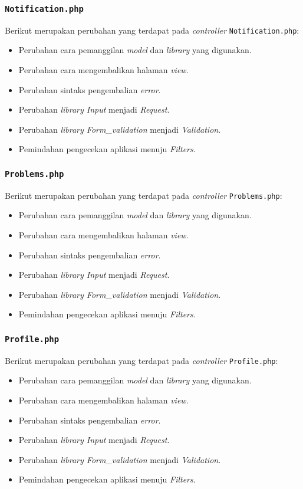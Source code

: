 \subsubsection{\texttt{Notification.php}}
Berikut merupakan perubahan yang terdapat pada  \textit{controller} \texttt{Notification.php}:
\begin{itemize}
	\item Perubahan cara pemanggilan \textit{model} dan \textit{library} yang digunakan.
	\item Perubahan cara mengembalikan halaman \textit{view}.
	\item Perubahan sintaks pengembalian \textit{error}.
	\item Perubahan \textit{library Input} menjadi \textit{Request}.
	\item Perubahan \textit{library Form\_validation} menjadi \textit{Validation}.
	\item Pemindahan pengecekan aplikasi menuju \textit{Filters}.
\end{itemize}
\subsubsection{\texttt{Problems.php}}
Berikut merupakan perubahan yang terdapat pada \textit{controller} \texttt{Problems.php}:
\begin{itemize}
	\item Perubahan cara pemanggilan \textit{model} dan \textit{library} yang digunakan.
	\item Perubahan cara mengembalikan halaman \textit{view}.
	\item Perubahan sintaks pengembalian \textit{error}.
	\item Perubahan \textit{library Input} menjadi \textit{Request}.
	\item Perubahan \textit{library Form\_validation} menjadi \textit{Validation}.
	\item Pemindahan pengecekan aplikasi menuju \textit{Filters}.
\end{itemize}
\subsubsection{\texttt{Profile.php}}
Berikut merupakan perubahan yang terdapat pada \textit{controller} \texttt{Profile.php}:
\begin{itemize}
	\item Perubahan cara pemanggilan \textit{model} dan \textit{library} yang digunakan.
	\item Perubahan cara mengembalikan halaman \textit{view}.
	\item Perubahan sintaks pengembalian \textit{error}.
	\item Perubahan \textit{library Input} menjadi \textit{Request}.
	\item Perubahan \textit{library Form\_validation} menjadi \textit{Validation}.
	\item Pemindahan pengecekan aplikasi menuju \textit{Filters}.
\end{itemize}
